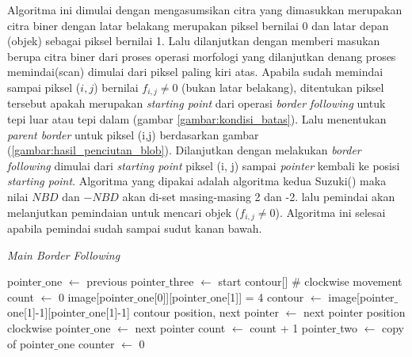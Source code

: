 Algoritma ini dimulai dengan mengasumsikan citra yang 
dimasukkan merupakan citra biner dengan latar belakang 
merupakan piksel bernilai 0 dan latar depan (objek) 
sebagai piksel bernilai 1. Lalu dilanjutkan dengan 
memberi masukan berupa citra biner dari proses operasi 
morfologi yang dilanjutkan denang proses memindai(scan) 
dimulai dari piksel paling kiri atas. Apabila sudah memindai
sampai piksel ($i, j$) bernilai $f_{i,j} \neq 0$ (bukan latar
belakang), ditentukan piksel tersebut apakah merupakan 
\textit{starting point}  dari operasi \textit{border following}
untuk tepi luar atau tepi dalam (gambar \ref{gambar:kondisi_batas}).
Lalu menentukan \textit{parent border} untuk piksel 
(i,j) berdasarkan gambar (\ref{gambar:hasil_penciutan_blob}).
Dilanjutkan dengan melakukan \textit{border following} dimulai 
dari \textit{starting point} piksel (i, j) sampai 
\textit{pointer} kembali ke posisi \textit{starting point}.
Algoritma yang dipakai adalah algoritma kedua Suzuki(\cite{Suzuki})
maka nilai $N B D$ dan $- N B D$ akan di-set 
masing-masing 2 dan -2. lalu pemindai akan melanjutkan pemindaian
untuk mencari objek ($f_{i,j} \neq 0$). Algoritma ini selesai
apabila pemindai sudah sampai sudut kanan bawah.
\begin{algorithm}[H]
  \caption{\textit{Main Border Following}}
  \begin{algorithmic}[1]
    \State pointer$\_$one $\gets$ previous
    \State pointer$\_$three $\gets$ start
    \State contour[]
    \Statex
    \State \# clockwise movement
    \State count $\gets$ 0
       
        \State image[pointer$\_$one[0]][pointer$\_$one[1]] = 4
        \State contour $\gets$ image[pointer$\_$one[1]-1][pointer$\_$one[1]-1]
        \State \Return contour
      \EndIf
      \State position, next pointer $\gets$ next pointer position clockwise
      \State pointer$\_$one $\gets$ next pointer
      \State count $\gets$ count + 1
    \EndWhile
    \State pointer$\_$two $\gets$ copy of pointer$\_$one
    \State counter $\gets$ 0
  \end{algorithmic}
  \label{algoritma:BorderFollowing}
\end{algorithm}

